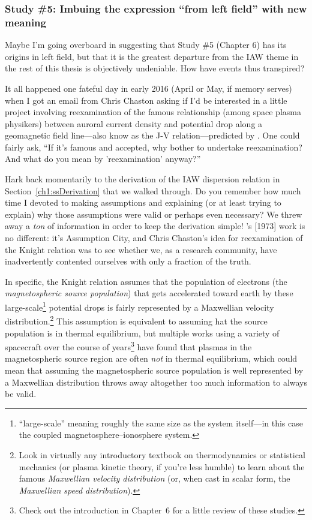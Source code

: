 \subsubsection{Study \#5: Imbuing the expression ``from left field'' with new meaning}

Maybe I'm going overboard in suggesting that Study \#5 (Chapter 6) has its
origins in left field, but that it is the greatest departure from the IAW theme
in the rest of this thesis is objectively undeniable. How have events thus transpired?

It all happened one fateful day in early 2016 (April or May, if memory serves)
when I got an email from Chris Chaston asking if I'd be interested in a little
project involving reexamination of the famous relationship (among space plasma
physikers) between auroral current density and potential drop along a
geomagnetic field line---also know as the J-V relation---predicted by
\citet{Knight1973}. One could fairly ask, ``If it's famous and accepted, why
bother to undertake reexamination? And what do you mean by 'reexamination'
anyway?''

Hark back momentarily to the derivation of the IAW dispersion relation in
Section~\ref{ch1:ssDerivation} that we walked through. Do you remember how much
time I devoted to making assumptions and explaining (or at least trying to
explain) why those assumptions were valid or perhaps even necessary? We threw
away a \emph{ton} of information in order to keep the derivation simple!
\citeauthor{Knight1973}'s [1973] work is no different: it's Assumption City, and
Chris Chaston's idea for reexamination of the Knight relation was to see
whether we, as a research community, have inadvertently contented ourselves with
only a fraction of the truth.

In specific, the Knight relation assumes that the population of electrons (the
\emph{magnetospheric source population}) that gets accelerated toward earth by
these large-scale\footnote{``large-scale'' meaning roughly the same size as the
  system itself---in this case the coupled magnetosphere--ionosphere system.}
potential drops is fairly represented by a Maxwellian velocity
distribution.\footnote{Look in virtually any introductory textbook on
  thermodynamics or statistical mechanics (or plasma kinetic theory, if you're
  less humble) to learn about the famous \emph{Maxwellian velocity distribution}
  (or, when cast in scalar form, the \emph{Maxwellian speed distribution}).}
This assumption is equivalent to assuming hat the source population is in
thermal equilibrium, but multiple works using a variety of spacecraft over the
course of years\footnote{Check out the introduction in Chapter~6 for a little
  review of these studies.} have found that plasmas in the magnetospheric source
region are often \emph{not} in thermal equilibrium, which could mean that
assuming the magnetospheric source population is well represented by a
Maxwellian distribution throws away altogether too much information to always be
valid.

